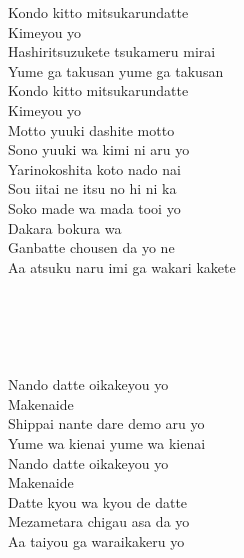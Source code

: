 \begin{multicols}{2}
Kondo kitto mitsukarundatte\\
Kimeyou yo\\
Hashiritsuzukete tsukameru mirai\\
Yume ga takusan yume ga takusan\\
Kondo kitto mitsukarundatte\\
Kimeyou yo\\
Motto yuuki dashite motto\\
Sono yuuki wa kimi ni aru yo\\

Yarinokoshita koto nado nai\\
Sou iitai ne itsu no hi ni ka\\
Soko made wa mada tooi yo\\
Dakara bokura wa\\
Ganbatte chousen da yo ne\\
Aa atsuku naru imi ga wakari kakete\\

\\
\\
 \\
 \\
 \\

Nando datte oikakeyou yo\\
Makenaide\\
Shippai nante dare demo aru yo\\
Yume wa kienai yume wa kienai\\
Nando datte oikakeyou yo\\
Makenaide\\
Datte kyou wa kyou de datte\\
Mezametara chigau asa da yo\\
Aa taiyou ga waraikakeru yo\\
\end{multicols}

\ifdefined\COMPLETE
\else
	
\fi
